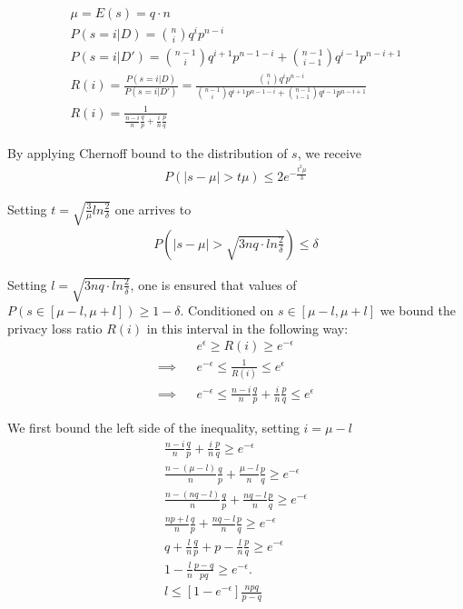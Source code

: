 \documentclass[11pt]{article}
\begin{document}
\begin{align}
\mu = E(s) = q \cdot n \\
P(s=i | D ) = \binom{n}{i}q^ip^{n-i} \\
P(s=i | D' ) = \binom{n-1}{i}q^{i+1}p^{n-1-i} +   \binom{n-1}{i-1}q^{i-1}p^{n-i+1}  \\
R(i)  = \frac{P(s=i | D)}{P(s=i | D')} = \frac{ \binom{n}{i}q^ip^{n-i} }{  \binom{n-1}{i}q^{i+1}p^{n-1-i} +   \binom{n-1}{i-1}q^{i-1}p^{n-i+1} } \\
R(i) =  \frac{1} { \frac{n-i}{n}\frac{q}{p} + \frac{i}{n} \frac{p}{q} }
\end{align}

By applying Chernoff bound to the distribution of $s$, we receive
 \begin{align}
P(|s - \mu| > t\mu) \le 2 e^{- \frac{t^2\mu}{3}}
\end{align}

Setting $t=\sqrt{\frac{3}{\mu} ln\frac{2}{\delta}}$ one arrives to
 \begin{align}
P \left (|s - \mu| >\sqrt{3nq \cdot ln\frac{2}{\delta}} \right ) \le \delta
\end{align}
 
Setting $l=\sqrt{3nq \cdot ln\frac{2}{\delta}}$, one is ensured that values of $P(s \in [\mu - l, \mu + l ]) \ge 1- \delta$. Conditioned on  $s \in [\mu - l, \mu + l ]$ we  bound the privacy loss ratio $R(i)$ in this interval in the following way:
\begin{align}
  && e^\epsilon \ge R(i) \ge e^{-\epsilon} \\ 
 \implies &&  e^{-\epsilon} \le \frac{1}{R(i)} \le e^\epsilon \\
  \implies &&  e^{-\epsilon} \le \frac{n-i}{n}\frac{q}{p} + \frac{i}{n} \frac{p}{q} \le e^\epsilon
\end{align}

We first bound the left side of the inequality, setting $i = \mu - l$
\begin{align}
\frac{n-i}{n}\frac{q}{p} + \frac{i}{n} \frac{p}{q} \ge e^{-\epsilon} \\
\frac{n-(\mu-l)}{n}\frac{q}{p} + \frac{\mu-l}{n} \frac{p}{q} \ge e^{-\epsilon} \\
\frac{n-(nq-l)}{n}\frac{q}{p} + \frac{nq-l}{n} \frac{p}{q} \ge e^{-\epsilon} \\
\frac{np + l}{n}\frac{q}{p} + \frac{nq-l}{n} \frac{p}{q} \ge e^{-\epsilon} \\
q + \frac{l}{n}\frac{q}{p} +  p - \frac{l}{n} \frac{p}{q} \ge e^{-\epsilon} \\
1 - \frac{l}{n} \frac{p-q}{pq}  \ge e^{-\epsilon}. \\
l \le \left [ 1 - e^{-\epsilon}\right ] \frac { npq}{p - q}  
\end{align}
\end{document}
